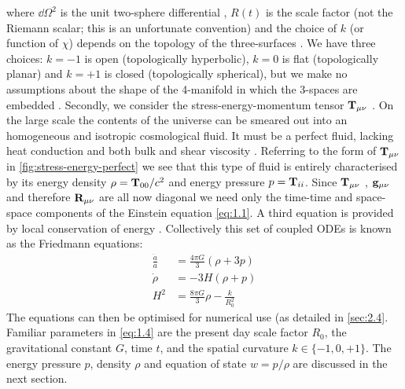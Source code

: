 where $\dd{\Omega}^2$ is the unit two-sphere differential \cite{doCarmo1976}, $R(t)$ is the scale factor (not the Riemann scalar; this is an unfortunate convention) and the choice of $k$ (or function of $\chi$) depends on the topology of the three-surfaces \cite{Friedmann1922}. We have three choices: $k = -1$ is open (topologically hyperbolic), $k = 0$ is flat (topologically planar) and $k = +1$ is closed (topologically spherical), but we make no assumptions about the shape of the 4-manifold in which the 3-spaces are embedded \cite{Friedmann1922,vanOsten2006}. 
Secondly, we consider the stress-energy-momentum tensor $\mathbf{T}_{\mu\nu}$ . On the large scale the contents of the universe can be smeared out into an homogeneous and isotropic cosmological fluid. It must be a perfect fluid, lacking heat conduction and both bulk and shear viscosity \cite{Hobson2006}. Referring to the form of $\mathbf{T}_{\mu\nu}$ in \cref{fig:stress-energy-perfect} we see that this type of fluid is entirely characterised by its energy density $\rho = \mathbf{T}_{00}/c^2$ and energy pressure $p = \mathbf{T}_{ii}$. Since $\mathbf{T}_{\mu\nu}$ , $\mathbf{g}_{\mu\nu}$ and therefore $\mathbf{R}_{\mu\nu}$ are all now diagonal we need only the time-time and space- space components of the Einstein equation \cref{eq:1.1}. 
A third equation is provided by local conservation of energy \cite{Linder1988a}. 
Collectively this set of coupled ODEs is known as the Friedmann equations:
\begin{subequations}
\label{eq:1.4}
\begin{align}
    \label{eq:1.4a} \frac{\ddot{a}}{a} &= \frac{4\pi{}G}{3} \left( \rho{} + 3p \right) \\
    \label{eq:1.4b} \dot{\rho{}} &= -3H(\rho{} + p) \\
    \label{eq:1.4c} H^{2} &= \frac{8\pi{}G}{3} \rho{} - \frac{k}{R_{0}^{2}}
\end{align}
\end{subequations}
The equations can then be optimised for numerical use (as detailed in \cref{sec:2.4}. Familiar parameters in \cref{eq:1.4} are the present day scale factor $R_0$, the gravitational constant $G$, time $t$, and the spatial curvature $k \in \{-1, 0, +1\}$. The energy pressure $p$, density $\rho$ and equation of state $w = p / \rho $ are discussed in the next section.
